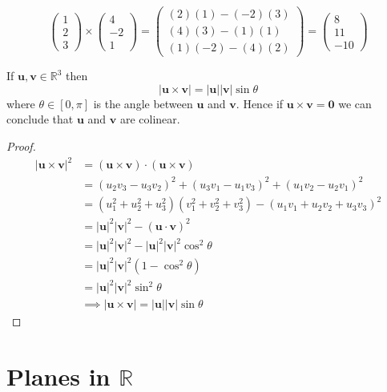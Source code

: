 \begin{example}
    \[
        \begin{pmatrix}
            1\\2\\3
        \end{pmatrix}
        \times
        \begin{pmatrix}
            4\\-2\\1
        \end{pmatrix}
        =
        \begin{pmatrix}
            (2)(1)-(-2)(3)\\
            (4)(3)-(1)(1)\\
            (1)(-2)-(4)(2)
        \end{pmatrix}
        =
        \begin{pmatrix}
            8\\11\\-10
        \end{pmatrix}
    \]
\end{example}

\begin{lemma}
    If $\bm u,\bm v\in\mathbb R^3$ then 
    \[|\bm u\times\bm v|=|\bm u||\bm v|\sin\theta\]
    where $\theta\in[0,\pi]$ is the angle between $\bm u$ and $\bm v$. Hence if $\bm u\times\bm v=\bm 0$ we can conclude that $\bm u$ and $\bm v$ are colinear.
\end{lemma}

\begin{proof}
    \begin{align*}
        |\bm u\times\bm v|^2&=(\bm u\times\bm v)\cdot(\bm u\times\bm v)\\
        &=(u_2v_3-u_3v_2)^2+(u_3v_1-u_1v_3)^2+(u_1v_2-u_2v_1)^2\\
        &=(u_1^2+u_2^2+u_3^2)(v_1^2+v_2^2+v_3^2)-(u_1v_1+u_2v_2+u_3v_3)^2\\
        &=|\bm u|^2|\bm v|^2-(\bm u\cdot\bm v)^2\\
        &=|\bm u|^2|\bm v|^2-|\bm u|^2|\bm v|^2\cos^2\theta\\
        &=|\bm u|^2|\bm v|^2(1-\cos^2\theta)\\
        &=|\bm u|^2|\bm v|^2\sin^2\theta\\
        &\implies|\bm u\times\bm v|=|\bm u||\bm v|\sin\theta
    \end{align*}
\end{proof}

\section{Planes in $\mathbb R$}

